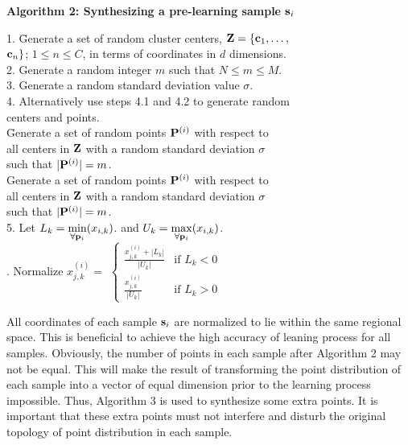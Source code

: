 \documentclass[lettersize,journal]{IEEEtran}
\begin{document}
\vspace{0.2in}
\noindent
\IEEEpubidadjcol
{\bf Algorithm 2: Synthesizing a pre-learning sample ${\bf s}_{i}$}
\label{alg2}
\begin{tabbing}
1. \= Generate a set of random cluster centers, ${\bf Z} = \{{\bf c}_{1}, \ldots, $ \\
   \> ${\bf c}_{n}\}$; $1 \leq n \leq C$, in terms of coordinates in $d$ dimensions. \\
2. \> Generate a random integer $m$ such that $N \leq m \leq M$. \\
3. \> Generate a random standard deviation value $\sigma$. \\
4. \> Alternatively use steps 4.1 and 4.2 to generate random \\
   \> centers and points.\\
    \= Generate a set of random points ${\bf P}^{(i)}$ with respect to \\
   \>     \> all centers in ${\bf Z}$ with a random standard deviation $\sigma$ \\
   \>     \> such that $|{\bf P}^{(i)}| = m$. \\
    \> Generate a set of random points ${\bf P}^{(i)}$ with respect to \\
   \>     \> all centers in ${\bf Z}$ with a random standard deviation $\sigma$ \\
   \>     \> such that $|{\bf P}^{(i)}| = m$. \\
5. \> Let $L_{k} = \min\limits_{\forall {\bf p}_{i}} (x_{i,k})$. and  $U_{k} = \max\limits_{\forall 
{\bf p}_{i}} (x_{i,k})$. \\
. \> Normalize $ x^{(i)}_{j,k} = $ $\left\{ \begin{array}{ll}
                                 \frac{x^{(i)}_{j,k} + |L_{k}|}{|U_{k}|} & \mbox{if $L_{k} < 0$} \\
                                 \frac{x^{(i)}_{j,k}}{|U_{k}|} & \mbox{if $L_{k} > 0$}
                                 \end{array} 
                                 \right . $
\end{tabbing}

All coordinates of each sample ${\bf s}_{i}$ are normalized to lie within the same regional space. This 
is beneficial to achieve the high accuracy of leaning process for all samples.
Obviously, the number of points in each sample after Algorithm 2 may not be equal. This will make the 
result of transforming the point distribution of each sample into a vector of equal dimension prior to the
learning process impossible. Thus, Algorithm 3 is used to synthesize some extra points. It is important 
that these extra points must not interfere and disturb the original topology of point distribution in each 
sample.
\end{document}
